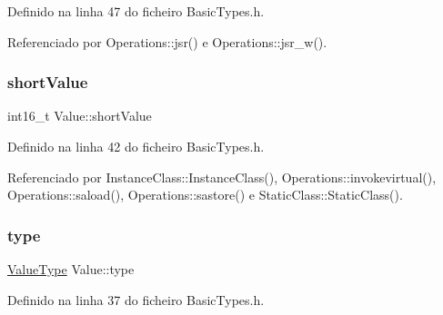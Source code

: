 Definido na linha 47 do ficheiro Basic\+Types.\+h.



Referenciado por Operations\+::jsr() e Operations\+::jsr\+\_\+w().

\mbox{\label{structValue_a9055b0f42ce03a06758b262c3bb32358}} 
\subsubsection{\texorpdfstring{short\+Value}{shortValue}}
{\footnotesize\ttfamily int16\+\_\+t Value\+::short\+Value}



Definido na linha 42 do ficheiro Basic\+Types.\+h.



Referenciado por Instance\+Class\+::\+Instance\+Class(), Operations\+::invokevirtual(), Operations\+::saload(), Operations\+::sastore() e Static\+Class\+::\+Static\+Class().

\mbox{\label{structValue_ab45dfd167290d4324ba4832abcc4064d}} 
\subsubsection{\texorpdfstring{type}{type}}
{\footnotesize\ttfamily \hyperlink{BasicTypes_8h_ad9971b6ef33e02ba2c75d19c1d2518a1}{Value\+Type} Value\+::type}



Definido na linha 37 do ficheiro Basic\+Types.\+h.




